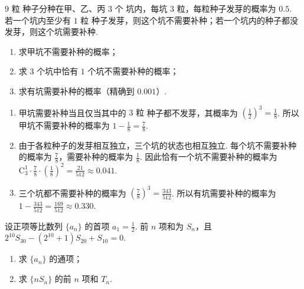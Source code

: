 \begin{problem}
\(9\text{ 粒}\) 种子分种在甲、乙、丙 \(3\text{ 个}\) 坑内，每坑 \(3\text{ 粒}\)，每粒种子发芽的概率为 \(0.5\). 若一个坑内至少有 \(1\text{ 粒}\) 种子发芽，则这个坑不需要补种；若一个坑内的种子都没发芽，则这个坑需要补种.

\begin{enumerate}
\item 求甲坑不需要补种的概率；
\item 求 \(3\) 个坑中恰有 \(1\) 个坑不需要补种的概率；
\item 求有坑需要补种的概率（精确到 \(0.001\)）.
\end{enumerate}
\end{problem}

\begin{solution}
\begin{enumerate}
\item 甲坑需要补种当且仅当其中的 \(3\text{ 粒}\) 种子都不发芽，其概率为 \(\left(\frac{1}{2}\right)^{3}=\frac{1}{8}\). 所以甲坑不需要补种的概率为 \(1-\frac{1}{8}=\frac{7}{8}\).
\item 由于各粒种子的发芽相互独立，三个坑的状态也相互独立. 每个坑不需要补种的概率为 \(\frac{7}{8}\)，需要补种的概率为 \(\frac{1}{8}\). 因此恰有一个坑不需要补种的概率为 \(\mathrm C_{3}^{1}\cdot\frac{7}{8}\cdot\left(\frac{1}{8}\right)^{2}=\frac{21}{512}\approx0.041\).
\item 三个坑都不需要补种的概率为 \(\left(\frac{7}{8}\right)^{3}=\frac{343}{512}\). 所以有坑需要补种的概率为 \(1-\frac{343}{512}=\frac{169}{512}\approx0.330\).
\end{enumerate}
\end{solution}

\begin{problem}
设正项等比数列 \(\{a_{n}\}\) 的首项 \(a_{1}=\frac{1}{2}\). 前 \(n\) 项和为 \(S_{n}\)，且 \(2^{10}S_{30}-(2^{10}+1)S_{20}+S_{10}=0\).

\begin{enumerate}
\item 求 \(\{a_{n}\}\) 的通项；
\item 求 \(\{nS_{n}\}\) 的前 \(n\) 项和 \(T_{n}\).
\end{enumerate}
\end{problem}


